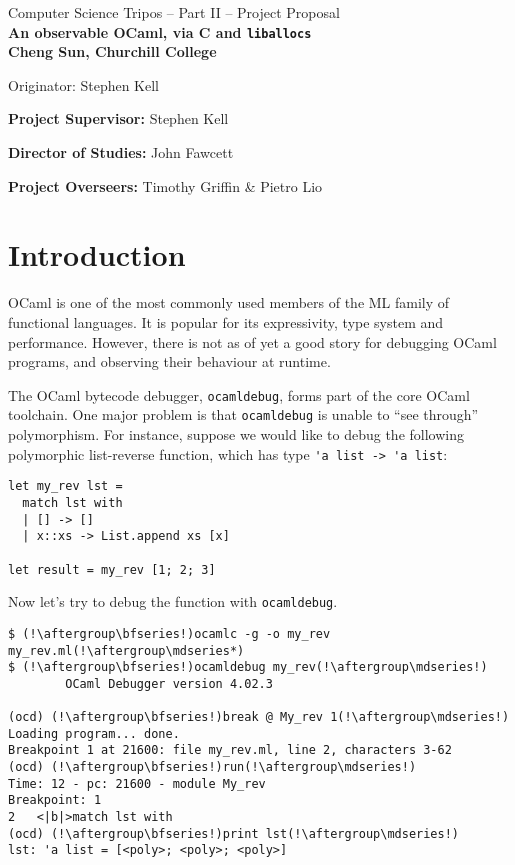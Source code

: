\documentclass[12pt,twoside,a4paper]{article}
\begin{document}
\begin{center}
\Large Computer Science Tripos -- Part II -- Project Proposal
\\[4mm]
\LARGE \bfseries An observable OCaml, via C and \lstinline{liballocs} \mdseries
\\[4mm]

\large
Cheng Sun, Churchill College

Originator: Stephen Kell

\makeatletter
\@date
\makeatother

\end{center}

\vspace{5mm}

\textbf{Project Supervisor:} Stephen Kell

\textbf{Director of Studies:} John Fawcett

\textbf{Project Overseers:} Timothy Griffin \& Pietro Lio


\section*{Introduction}

OCaml is one of the most commonly used members of the ML family of functional languages. It is popular for its expressivity, type system and performance. However, there is not as of yet a good story for debugging OCaml programs, and observing their behaviour at runtime.

The OCaml bytecode debugger, \lstinline{ocamldebug}, forms part of the core OCaml toolchain. One major problem is that \lstinline{ocamldebug} is unable to ``see through'' polymorphism. For instance, suppose we would like to debug the following polymorphic list-reverse function, which has type \lstinline{'a list -> 'a list}:

\begin{lstlisting}
let my_rev lst =
  match lst with
  | [] -> []
  | x::xs -> List.append xs [x]

let result = my_rev [1; 2; 3]
\end{lstlisting}

Now let's try to debug the function with \lstinline{ocamldebug}.

\begin{lstlisting}
$ (!\aftergroup\bfseries!)ocamlc -g -o my_rev my_rev.ml(!\aftergroup\mdseries*)
$ (!\aftergroup\bfseries!)ocamldebug my_rev(!\aftergroup\mdseries!)
        OCaml Debugger version 4.02.3

(ocd) (!\aftergroup\bfseries!)break @ My_rev 1(!\aftergroup\mdseries!)
Loading program... done.
Breakpoint 1 at 21600: file my_rev.ml, line 2, characters 3-62
(ocd) (!\aftergroup\bfseries!)run(!\aftergroup\mdseries!)
Time: 12 - pc: 21600 - module My_rev
Breakpoint: 1
2   <|b|>match lst with
(ocd) (!\aftergroup\bfseries!)print lst(!\aftergroup\mdseries!)
lst: 'a list = [<poly>; <poly>; <poly>]
\end{lstlisting}
\end{document}

